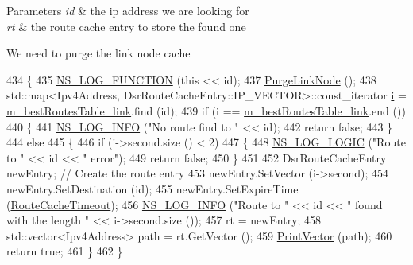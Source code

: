 \begin{DoxyParams}{Parameters}
{\em id} & the ip address we are looking for \\
\hline
{\em rt} & the route cache entry to store the found one \\
\hline
\end{DoxyParams}
We need to purge the link node cache 
\begin{DoxyCode}
434 \{
435   \hyperlink{log-macros-disabled_8h_a90b90d5bad1f39cb1b64923ea94c0761}{NS\_LOG\_FUNCTION} (\textcolor{keyword}{this} << \textcolor{keywordtype}{id});
437   \hyperlink{classns3_1_1dsr_1_1DsrRouteCache_a0a053ff3dc1d3872188e85e30d1afb7e}{PurgeLinkNode} ();
438   std::map<Ipv4Address, DsrRouteCacheEntry::IP\_VECTOR>::const\_iterator \hyperlink{bernuolliDistribution_8m_a6f6ccfcf58b31cb6412107d9d5281426}{i} = 
      \hyperlink{classns3_1_1dsr_1_1DsrRouteCache_aeff05d869cb32e13605d4792a0a0d841}{m\_bestRoutesTable\_link}.find (\textcolor{keywordtype}{id});
439   \textcolor{keywordflow}{if} (i == \hyperlink{classns3_1_1dsr_1_1DsrRouteCache_aeff05d869cb32e13605d4792a0a0d841}{m\_bestRoutesTable\_link}.end ())
440     \{
441       \hyperlink{group__logging_gafbd73ee2cf9f26b319f49086d8e860fb}{NS\_LOG\_INFO} (\textcolor{stringliteral}{"No route find to "} << \textcolor{keywordtype}{id});
442       \textcolor{keywordflow}{return} \textcolor{keyword}{false};
443     \}
444   \textcolor{keywordflow}{else}
445     \{
446       \textcolor{keywordflow}{if} (i->second.size () < 2)
447         \{
448           \hyperlink{group__logging_ga88acd260151caf2db9c0fc84997f45ce}{NS\_LOG\_LOGIC} (\textcolor{stringliteral}{"Route to "} << \textcolor{keywordtype}{id} << \textcolor{stringliteral}{" error"});
449           \textcolor{keywordflow}{return} \textcolor{keyword}{false};
450         \}
451 
452       DsrRouteCacheEntry newEntry; \textcolor{comment}{// Create the route entry}
453       newEntry.SetVector (i->second);
454       newEntry.SetDestination (\textcolor{keywordtype}{id});
455       newEntry.SetExpireTime (\hyperlink{classns3_1_1dsr_1_1DsrRouteCache_a6a2bdf2226910392a4578cc82216acaf}{RouteCacheTimeout});
456       \hyperlink{group__logging_gafbd73ee2cf9f26b319f49086d8e860fb}{NS\_LOG\_INFO} (\textcolor{stringliteral}{"Route to "} << \textcolor{keywordtype}{id} << \textcolor{stringliteral}{" found with the length "} << i->second.size ());
457       rt = newEntry;
458       std::vector<Ipv4Address> path = rt.GetVector ();
459       \hyperlink{classns3_1_1dsr_1_1DsrRouteCache_a9d47644d07a4b6f1ec0c429cdb1bdf37}{PrintVector} (path);
460       \textcolor{keywordflow}{return} \textcolor{keyword}{true};
461     \}
462 \}
\end{DoxyCode}



